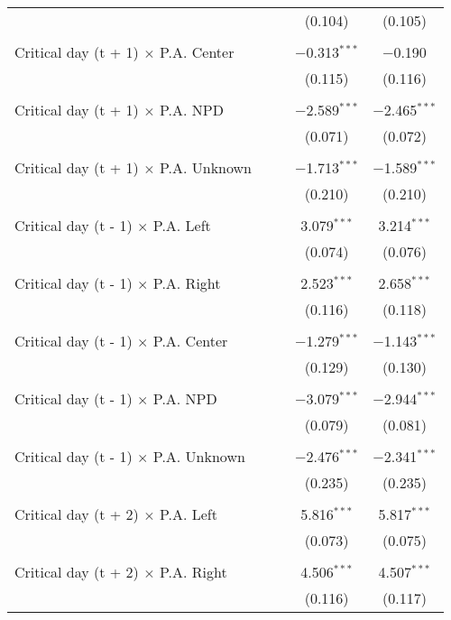 \documentclass[
]{article}
\begin{document}
\begin{table}[!htbp]
{\begin{tabular}{@{\extracolsep{5pt}}lcccc}
  &  &  & (0.104) & (0.105) \\ 
  & & & & \\ 
 Critical day (t + 1) $\times$ P.A. Center &  &  & $-$0.313$^{***}$ & $-$0.190 \\ 
  &  &  & (0.115) & (0.116) \\ 
  & & & & \\ 
 Critical day (t + 1) $\times$ P.A. NPD &  &  & $-$2.589$^{***}$ & $-$2.465$^{***}$ \\ 
  &  &  & (0.071) & (0.072) \\ 
  & & & & \\ 
 Critical day (t + 1) $\times$ P.A. Unknown &  &  & $-$1.713$^{***}$ & $-$1.589$^{***}$ \\ 
  &  &  & (0.210) & (0.210) \\ 
  & & & & \\ 
 Critical day (t - 1) $\times$ P.A. Left &  &  & 3.079$^{***}$ & 3.214$^{***}$ \\ 
  &  &  & (0.074) & (0.076) \\ 
  & & & & \\ 
 Critical day (t - 1) $\times$ P.A. Right &  &  & 2.523$^{***}$ & 2.658$^{***}$ \\ 
  &  &  & (0.116) & (0.118) \\ 
  & & & & \\ 
 Critical day (t - 1) $\times$ P.A. Center &  &  & $-$1.279$^{***}$ & $-$1.143$^{***}$ \\ 
  &  &  & (0.129) & (0.130) \\ 
  & & & & \\ 
 Critical day (t - 1) $\times$ P.A. NPD &  &  & $-$3.079$^{***}$ & $-$2.944$^{***}$ \\ 
  &  &  & (0.079) & (0.081) \\ 
  & & & & \\ 
 Critical day (t - 1) $\times$ P.A. Unknown &  &  & $-$2.476$^{***}$ & $-$2.341$^{***}$ \\ 
  &  &  & (0.235) & (0.235) \\ 
  & & & & \\ 
 Critical day (t + 2) $\times$ P.A. Left &  &  & 5.816$^{***}$ & 5.817$^{***}$ \\ 
  &  &  & (0.073) & (0.075) \\ 
  & & & & \\ 
 Critical day (t + 2) $\times$ P.A. Right &  &  & 4.506$^{***}$ & 4.507$^{***}$ \\ 
  &  &  & (0.116) & (0.117) \\ 

\end{tabular}}
\end{table}
\end{document}
